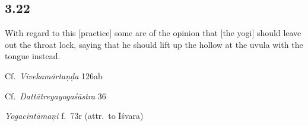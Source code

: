 \begin{ekdosis}


\subsection*{3.22}
\begin{translation}[hp03_022]
With regard to this [practice] some are of the opinion that [the yogi] should leave out the throat lock, saying that he should lift up the hollow at the uvula with the tongue instead.
\end{translation}

\begin{sources}[hp03_022]
Cf.~\emph{Vivekamārtaṇḍa} 126ab
\begin{versinnote}
\end{versinnote}
Cf.~\emph{Dattātreyayogaśāstra} 36
\begin{versinnote}
\end{versinnote}
\end{sources}

\begin{testimonia}[hp03_022]
\emph{Yogacintāmaṇi} f.~73r (attr.~to Īśvara)%
\begin{versinnote}
\end{versinnote}


\end{testimonia}
\end{ekdosis}
